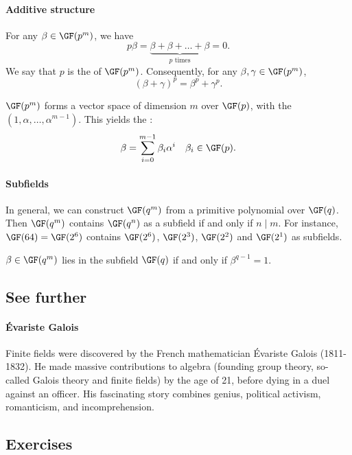 \documentclass[a4paper, 11pt, openany]{book}
\begin{document}
\paragraph{Additive structure}
For any $\beta \in \GF(p^m)$, we have
\[
	p \beta = \underbrace{\beta + \beta + \dots + \beta}_{p \text{ times}} = 0.
\]
We say that $p$ is the  of $\GF(p^m)$. Consequently, for any $\beta, \gamma \in \GF(p^m)$,
\[
	(\beta + \gamma)^p = \beta^p + \gamma^p.
\]

$\GF(p^m)$ forms a vector space of dimension $m$ over $\GF(p)$, with the  $(1, \alpha, \dots, \alpha^{m-1})$.
This yields the :
\[
	\beta = \sum_{i=0}^{m-1} \beta_i \alpha^i \quad \beta_i \in \GF(p).
\]


\paragraph{Subfields}
In general, we can construct $\GF(q^m)$ from a primitive polynomial over $\GF(q)$. Then $\GF(q^m)$ contains $\GF(q^n)$ as a subfield if and only if $n \mid m$. For instance, $\GF(64) = \GF(2^6)$ contains $\GF(2^6)$, $\GF(2^3)$, $\GF(2^2)$ and $\GF(2^1)$ as subfields.

\begin{theorem}
$\beta \in \GF(q^m)$ lies in the subfield $\GF(q)$ if and only if $\beta^{q-1} = 1$.
\end{theorem}

\subsection{See further}

\paragraph{\'{E}variste Galois}
Finite fields were discovered by the French mathematician \'{E}variste Galois (1811-1832). He made massive contributions to algebra (founding group theory, so-called Galois theory and finite fields) by the age of 21, before dying in a duel against an officer. His fascinating story combines genius, political activism, romanticism, and incomprehension.


\subsection{Exercises}
\end{document}
